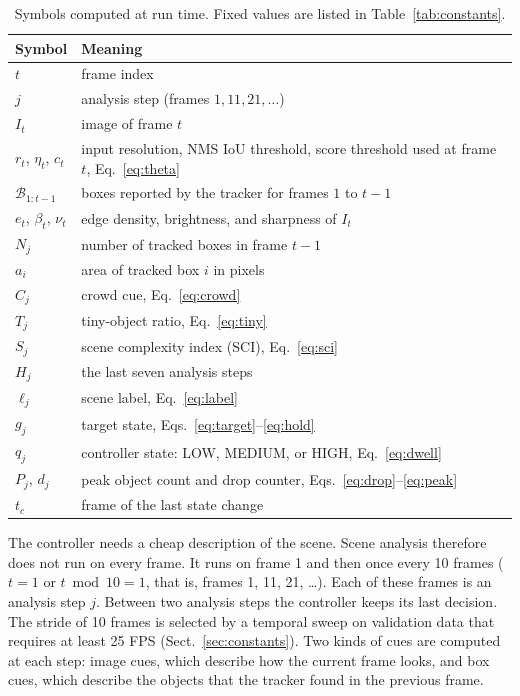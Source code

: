 \documentclass[pdflatex,sn-mathphys-num,iicol]{sn-jnl}
\makeatletter
\def\subsectionfont{\reset@font\fontfamily{\rmdefault}\fontsize{10bp}{12bp}\bfseries\selectfont\raggedright\boldmath}
\renewcommand\subsection{\@startsection{subsection}{2}{\z@}{-7pt \@plus -2pt \@minus -2pt}{3pt}{\subsectionfont}}
\makeatother
\begin{document}
\begin{table}[t]
\caption{Symbols computed at run time. Fixed values are listed in
Table~\ref{tab:constants}.}
\label{tab:symbols}
\centering\footnotesize
\setlength{\tabcolsep}{4pt}
\begin{tabular}{@{}l>{\raggedright\arraybackslash}p{55mm}@{}}
\toprule
Symbol & Meaning\\
\midrule
$t$ & frame index\\
$j$ & analysis step (frames $1, 11, 21, \dots$)\\
$I_t$ & image of frame $t$\\
$r_t$, $\eta_t$, $c_t$ & input resolution, NMS IoU threshold, score threshold
  used at frame $t$, Eq.~\eqref{eq:theta}\\
$\mathcal{B}_{1:t-1}$ & boxes reported by the tracker for frames $1$ to $t-1$\\
$e_t$, $\beta_t$, $\nu_t$ & edge density, brightness, and sharpness of $I_t$\\
$N_j$ & number of tracked boxes in frame $t-1$\\
$a_i$ & area of tracked box $i$ in pixels\\
$C_j$ & crowd cue, Eq.~\eqref{eq:crowd}\\
$T_j$ & tiny-object ratio, Eq.~\eqref{eq:tiny}\\
$S_j$ & scene complexity index (SCI), Eq.~\eqref{eq:sci}\\
$H_j$ & the last seven analysis steps\\
$\ell_j$ & scene label, Eq.~\eqref{eq:label}\\
$g_j$ & target state, Eqs.~\eqref{eq:target}--\eqref{eq:hold}\\
$q_j$ & controller state: LOW, MEDIUM, or HIGH, Eq.~\eqref{eq:dwell}\\
$P_j$, $d_j$ & peak object count and drop counter,
  Eqs.~\eqref{eq:drop}--\eqref{eq:peak}\\
$t_c$ & frame of the last state change\\
\bottomrule
\end{tabular}
\end{table}

\subsection{Scene cues}\label{sec:cues}
The controller needs a cheap description of the scene. Scene analysis
therefore does not run on every frame. It runs on frame 1 and then once
every 10 frames ($t=1$ or $t \bmod 10 = 1$, that is, frames 1, 11, 21,
\dots). Each of these frames is an analysis step $j$. Between two analysis
steps the controller keeps its last decision. The stride of 10 frames is
selected by a temporal sweep on validation data that requires at least 25
FPS (Sect.~\ref{sec:constants}). Two kinds of cues are computed
at each step: image cues, which describe how the current frame looks, and box
cues, which describe the objects that the tracker found in the previous
frame.
\end{document}
